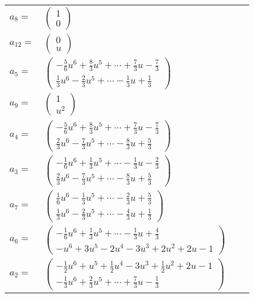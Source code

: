 \documentclass[1p]{elsarticle_modified}
\theoremstyle{definition}
\begin{document}
\begin{tabular}{m{7pt} m{180pt} m{7pt} m{180pt} }
\flushright $a_{8}=$&$\begin{pmatrix}1\\0\end{pmatrix}$ \\
\flushright $a_{12}=$&$\begin{pmatrix}0\\u\end{pmatrix}$ \\
\flushright $a_{5}=$&$\begin{pmatrix}-\frac{5}{6} u^6+\frac{8}{3} u^5+\cdots+\frac{7}{3} u-\frac{7}{3}\\\frac{1}{3} u^6-\frac{2}{3} u^5+\cdots-\frac{1}{3} u+\frac{1}{3}\end{pmatrix}$ \\
\flushright $a_{9}=$&$\begin{pmatrix}1\\u^2\end{pmatrix}$ \\
\flushright $a_{4}=$&$\begin{pmatrix}-\frac{5}{6} u^6+\frac{8}{3} u^5+\cdots+\frac{7}{3} u-\frac{7}{3}\\\frac{2}{3} u^6-\frac{7}{3} u^5+\cdots-\frac{8}{3} u+\frac{5}{3}\end{pmatrix}$ \\
\flushright $a_{3}=$&$\begin{pmatrix}-\frac{1}{6} u^6+\frac{1}{3} u^5+\cdots-\frac{1}{3} u-\frac{2}{3}\\\frac{2}{3} u^6-\frac{7}{3} u^5+\cdots-\frac{8}{3} u+\frac{5}{3}\end{pmatrix}$ \\
\flushright $a_{7}=$&$\begin{pmatrix}\frac{1}{6} u^6-\frac{1}{3} u^5+\cdots-\frac{2}{3} u+\frac{5}{3}\\\frac{1}{3} u^6-\frac{2}{3} u^5+\cdots-\frac{4}{3} u+\frac{1}{3}\end{pmatrix}$ \\
\flushright $a_{6}=$&$\begin{pmatrix}-\frac{1}{6} u^6+\frac{1}{3} u^5+\cdots-\frac{1}{3} u+\frac{4}{3}\\- u^6+3 u^5-2 u^4-3 u^3+2 u^2+2 u-1\end{pmatrix}$ \\
\flushright $a_{2}=$&$\begin{pmatrix}-\frac{1}{2} u^6+u^5+\frac{1}{2} u^4-3 u^3+\frac{1}{2} u^2+2 u-1\\-\frac{1}{3} u^6+\frac{2}{3} u^5+\cdots+\frac{7}{3} u-\frac{1}{3}\end{pmatrix}$ \\

\end{tabular}
\end{document}
